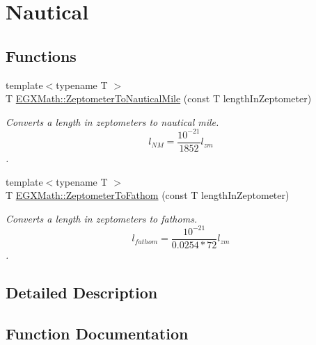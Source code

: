 \hypertarget{group___e_g_x_math-_conversions-_length_conversions-_s_i-_zeptometer-_nautical}{}\section{Nautical}
\label{group___e_g_x_math-_conversions-_length_conversions-_s_i-_zeptometer-_nautical}
\subsection*{Functions}
\begin{DoxyCompactItemize}
\item 
{\footnotesize template$<$typename T $>$ }\\T \mbox{\hyperlink{group___e_g_x_math-_conversions-_length_conversions-_s_i-_zeptometer-_nautical_ga9d6a1de6b4a8de39ba16da0a17cdca42}{E\+G\+X\+Math\+::\+Zeptometer\+To\+Nautical\+Mile}} (const T length\+In\+Zeptometer)
\begin{DoxyCompactList}\small\item\em Converts a length in zeptometers to nautical mile. \[ l_{NM}= \frac{10^{-21}}{1852} l_{zm} \]. \end{DoxyCompactList}\item 
{\footnotesize template$<$typename T $>$ }\\T \mbox{\hyperlink{group___e_g_x_math-_conversions-_length_conversions-_s_i-_zeptometer-_nautical_ga338ca94378cf11aca399ecdfc859950a}{E\+G\+X\+Math\+::\+Zeptometer\+To\+Fathom}} (const T length\+In\+Zeptometer)
\begin{DoxyCompactList}\small\item\em Converts a length in zeptometers to fathoms. \[ l_{fathom}= \frac{10^{-21}}{0.0254 * 72} l_{zm} \]. \end{DoxyCompactList}\end{DoxyCompactItemize}


\subsection{Detailed Description}


\subsection{Function Documentation}
\mbox{\label{group___e_g_x_math-_conversions-_length_conversions-_s_i-_zeptometer-_nautical_ga338ca94378cf11aca399ecdfc859950a}} 
